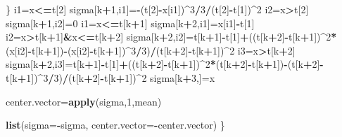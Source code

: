 \documentclass[11pt,]{article}
\newenvironment{Shaded}{\begin{snugshade}}{\end{snugshade}}
\newcommand{\KeywordTok}[1]{\textcolor[rgb]{0.13,0.29,0.53}{\textbf{#1}}}
\newcommand{\DataTypeTok}[1]{\textcolor[rgb]{0.13,0.29,0.53}{#1}}
\newcommand{\DecValTok}[1]{\textcolor[rgb]{0.00,0.00,0.81}{#1}}
\newcommand{\OperatorTok}[1]{\textcolor[rgb]{0.81,0.36,0.00}{\textbf{#1}}}
\newcommand{\NormalTok}[1]{#1}
\begin{document}
\begin{Shaded}
\begin{Highlighting}[]
\NormalTok{  \}}
\NormalTok{  i1=x}\OperatorTok{<=}\NormalTok{t[}\DecValTok{2}\NormalTok{]}
\NormalTok{  sigma[k}\OperatorTok{+}\DecValTok{1}\NormalTok{,i1]=}\OperatorTok{-}\NormalTok{(t[}\DecValTok{2}\NormalTok{]}\OperatorTok{-}\NormalTok{x[i1])}\OperatorTok{^}\DecValTok{3}\OperatorTok{/}\DecValTok{3}\OperatorTok{/}\NormalTok{(t[}\DecValTok{2}\NormalTok{]}\OperatorTok{-}\NormalTok{t[}\DecValTok{1}\NormalTok{])}\OperatorTok{^}\DecValTok{2}
\NormalTok{  i2=x}\OperatorTok{>}\NormalTok{t[}\DecValTok{2}\NormalTok{]}
\NormalTok{  sigma[k}\OperatorTok{+}\DecValTok{1}\NormalTok{,i2]=}\DecValTok{0}
\NormalTok{  i1=x}\OperatorTok{<=}\NormalTok{t[k}\OperatorTok{+}\DecValTok{1}\NormalTok{]}
\NormalTok{  sigma[k}\OperatorTok{+}\DecValTok{2}\NormalTok{,i1]=x[i1]}\OperatorTok{-}\NormalTok{t[}\DecValTok{1}\NormalTok{]}
\NormalTok{  i2=x}\OperatorTok{>}\NormalTok{t[k}\OperatorTok{+}\DecValTok{1}\NormalTok{]}\OperatorTok{&}\NormalTok{x}\OperatorTok{<=}\NormalTok{t[k}\OperatorTok{+}\DecValTok{2}\NormalTok{]}
\NormalTok{  sigma[k}\OperatorTok{+}\DecValTok{2}\NormalTok{,i2]=t[k}\OperatorTok{+}\DecValTok{1}\NormalTok{]}\OperatorTok{-}\NormalTok{t[}\DecValTok{1}\NormalTok{]}\OperatorTok{+}\NormalTok{((t[k}\OperatorTok{+}\DecValTok{2}\NormalTok{]}\OperatorTok{-}\NormalTok{t[k}\OperatorTok{+}\DecValTok{1}\NormalTok{])}\OperatorTok{^}\DecValTok{2}\OperatorTok{*}\NormalTok{(x[i2]}\OperatorTok{-}\NormalTok{t[k}\OperatorTok{+}\DecValTok{1}\NormalTok{])}\OperatorTok{-}\NormalTok{(x[i2]}\OperatorTok{-}\NormalTok{t[k}\OperatorTok{+}\DecValTok{1}\NormalTok{])}\OperatorTok{^}\DecValTok{3}\OperatorTok{/}\DecValTok{3}\NormalTok{)}\OperatorTok{/}\NormalTok{(t[k}\OperatorTok{+}\DecValTok{2}\NormalTok{]}\OperatorTok{-}\NormalTok{t[k}\OperatorTok{+}\DecValTok{1}\NormalTok{])}\OperatorTok{^}\DecValTok{2}
\NormalTok{  i3=x}\OperatorTok{>}\NormalTok{t[k}\OperatorTok{+}\DecValTok{2}\NormalTok{]}
\NormalTok{  sigma[k}\OperatorTok{+}\DecValTok{2}\NormalTok{,i3]=t[k}\OperatorTok{+}\DecValTok{1}\NormalTok{]}\OperatorTok{-}\NormalTok{t[}\DecValTok{1}\NormalTok{]}\OperatorTok{+}\NormalTok{((t[k}\OperatorTok{+}\DecValTok{2}\NormalTok{]}\OperatorTok{-}\NormalTok{t[k}\OperatorTok{+}\DecValTok{1}\NormalTok{])}\OperatorTok{^}\DecValTok{2}\OperatorTok{*}\NormalTok{(t[k}\OperatorTok{+}\DecValTok{2}\NormalTok{]}\OperatorTok{-}\NormalTok{t[k}\OperatorTok{+}\DecValTok{1}\NormalTok{])}\OperatorTok{-}\NormalTok{(t[k}\OperatorTok{+}\DecValTok{2}\NormalTok{]}\OperatorTok{-}\NormalTok{t[k}\OperatorTok{+}\DecValTok{1}\NormalTok{])}\OperatorTok{^}\DecValTok{3}\OperatorTok{/}\DecValTok{3}\NormalTok{)}\OperatorTok{/}\NormalTok{(t[k}\OperatorTok{+}\DecValTok{2}\NormalTok{]}\OperatorTok{-}\NormalTok{t[k}\OperatorTok{+}\DecValTok{1}\NormalTok{])}\OperatorTok{^}\DecValTok{2}
\NormalTok{  sigma[k}\OperatorTok{+}\DecValTok{3}\NormalTok{,]=x}
  
\NormalTok{  center.vector=}\KeywordTok{apply}\NormalTok{(sigma,}\DecValTok{1}\NormalTok{,mean)}
  
  \KeywordTok{list}\NormalTok{(}\DataTypeTok{sigma=}\OperatorTok{-}\NormalTok{sigma, }\DataTypeTok{center.vector=}\OperatorTok{-}\NormalTok{center.vector)}
\NormalTok{\}}
\end{Highlighting}
\end{Shaded}
\end{document}
